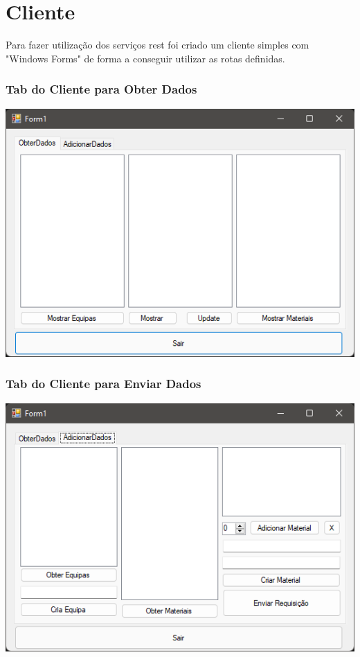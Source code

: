 \section{Cliente}

Para fazer utilização dos serviços rest foi criado um cliente simples com "Windows Forms" de forma a conseguir utilizar as rotas definidas.

\subsubsection{Tab do Cliente para Obter Dados}
\includegraphics[scale=0.75]{imagens/clienteObter.png}
\subsubsection{Tab do Cliente para Enviar Dados}
\includegraphics[scale=0.75]{imagens/ClienteEnviar.png}